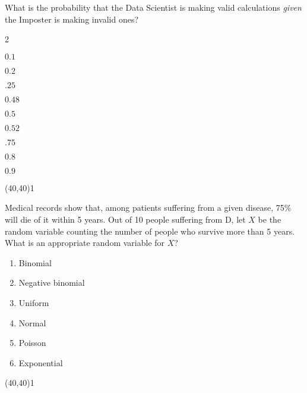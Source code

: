\documentclass[addpoints]{exam}
\def\solutions{0}
\begin{document}
{\begin{questions}
\question[3] What is the probability that the Data Scientist is making valid calculations \textit{given} the Imposter is making invalid ones?
\vspace{2mm}

\begin{minipage}[b]{.85\textwidth}
	\begin{enumerate}[label=\Alph*.]
	\end{enumerate}
\end{minipage}
\begin{minipage}[b]{.1\textwidth}
	\vspace{\fill}\framebox(40,40){\if\solutions1 \fi}
\end{minipage}

\clearpage
\question[3] Medical records show that, among patients suffering from a given disease, 75\% will die of it within 5 years.  Out of 10 people suffering from D, let $X$ be the random variable counting the number of people who survive more than 5 years.  What is an appropriate random variable for $X$?
\vspace{2mm}

\begin{minipage}[b]{.85\textwidth}
	\begin{enumerate}[label=\Alph*.]
		\item Binomial
		\item Negative binomial
		\item Uniform
		\item Normal
		\item Poisson
		\item Exponential
	\end{enumerate}
\end{minipage}
\begin{minipage}[b]{.1\textwidth}
	\vspace{\fill}\framebox(40,40){\if\solutions1 \fi}
\end{minipage}


\end{questions}}
\end{document}
